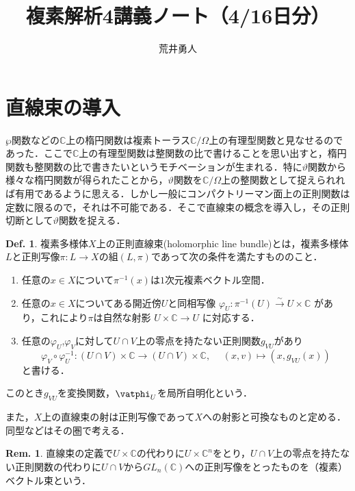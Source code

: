 \documentclass[dvipdfmx,b5paper,papersize]{jsarticle}
\title{複素解析4講義ノート（4/16日分）}
\author{荒井勇人}
\date{}
\theoremstyle{definition}
\newtheorem{defi}[thm]{Def.}
\newtheorem{rem}[thm]{Rem.}
\begin{document}
\maketitle

\begin{abstract}


\end{abstract}

\section{直線束の導入}
$\wp$関数などの$\mathbb{C}$上の楕円関数は複素トーラス$\mathbb{C}/\Omega$上の有理型関数と見なせるのであった．ここで$\mathbb{C}$上の有理型関数は整関数の比で書けることを思い出すと，楕円関数も整関数の比で書きたいというモチベーションが生まれる．特に$\vartheta$関数から様々な楕円関数が得られたことから，$\vartheta$関数を$\mathbb{C}/\Omega$上の整関数として捉えられれば有用であるように思える．しかし一般にコンパクトリーマン面上の正則関数は定数に限るので，それは不可能である．そこで直線束の概念を導入し，その正則切断として$\vartheta$関数を捉える．


\begin{defi}
  複素多様体$X$上の正則直線束(holomorphic line bundle)とは，複素多様体$L$と正則写像$\pi \colon L \to X$の組$(L,\pi)$であって次の条件を満たすもののこと．
  \begin{enumerate}
    \item 任意の$x\in X$について$\pi^{-1}(x)$は$1$次元複素ベクトル空間．
    \item 任意の$x\in X$についてある開近傍$U$と同相写像
    $\varphi_U \colon \pi^{-1}(U) \xrightarrow{\sim} U \times \mathbb{C}$
    があり，これにより$\pi$は自然な射影
    $U\times \mathbb{C} \to U$
    に対応する．
    \item 任意の$\varphi_U$,$\varphi_V$に対して$U \cap V$上の零点を持たない正則関数$g_{VU}$があり
    \[
    \varphi_V \circ \varphi_U^{-1} \colon (U \cap V)\times \mathbb{C} \longrightarrow (U \cap V)\times \mathbb{C}, \hspace{15pt} (x,v) \longmapsto (x,g_{VU}(x))
    \]
    と書ける．
  \end{enumerate}
  このとき$g_{VU}$を変換関数，$\vatphi_U$を局所自明化という．

  また，$X$上の直線束の射は正則写像であって$X$への射影と可換なものと定める．同型などはその圏で考える．
\end{defi}

\begin{rem}
  直線束の定義で$U\times \mathbb{C}$の代わりに$U\times \mathbb{C}^n$をとり，$U \cap V$上の零点を持たない正則関数の代わりに$U \cap V$から$GL_n(\mathbb{C})$への正則写像をとったものを（複素）ベクトル束という．
\end{rem}
\end{document}
